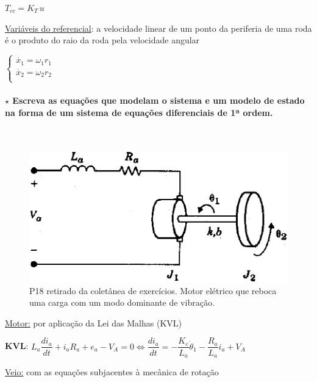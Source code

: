 \noindent \hspace*{1.5 em}\raisebox{0.2 em}{$\drsh$} $T_{cc} = K_T\, u$

\vspace{0.5em}
\noindent\underline{Variáveis do referencial}: a velocidade linear de um ponto da periferia de uma roda é o produto do raio da roda pela velocidade angular

\noindent \hspace*{1.5 em}\raisebox{0.2 em}{$\drsh$} $
                \begin{cases}
                    \dot{x_1} = \omega_1 r_1\\
                    \dot{x_2} = \omega_2 r_2\\
                \end{cases}
$

\clearpage
\paragraph[3.2.2.2 Problema 2]{$\pmb{\star}$ Escreva as equações que modelam o sistema e um modelo de estado na forma de um sistema de
equações diferenciais de 1ª ordem.}\mbox{}\\
\begin{figure}[H]
    \centering
    \includegraphics[width = 0.45\linewidth]{img/mechanics/motor-cc-P18.png}
    \caption{P18 retirado da coletânea de exercícios. Motor elétrico que reboca uma carga com um modo dominante de vibração.}
    \label{fig:motor-cc-P18}
\end{figure}

\noindent \underline{Motor:} por aplicação da Lei das Malhas (KVL)

\noindent \hspace*{1.5 em}\raisebox{0.2 em}{$\drsh$} \textbf{KVL}: $ L_a \dfrac{d i_a}{dt} + i_a R_a + e_a - V_A = 0 \iff \dfrac{d i_a}{dt} = -\dfrac{K_e}{L_a} \dot{\theta}_1 - \dfrac{R_a}{L_a} i_a + V_A$

\vspace{0.5em}
\noindent \underline{Veio:} com as equações subjacentes à mecânica de rotação


